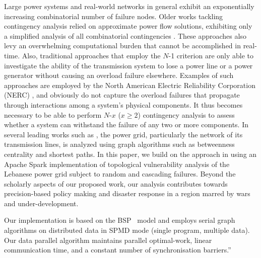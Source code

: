 Large power systems and real-world networks in general exhibit an exponentially increasing combinatorial number of failure nodes. Older works tackling contingency analysis relied on approximate power flow solutions, exhibiting only a simplified analysis of all combinatorial contingencies \cite{EjebeAl79,Ekwue91}. These approaches also levy an overwhelming computational burden that cannot be accomplished in real-time. Also, traditional approaches that employ the $N$-1 criterion are only able to investigate the ability of the transmission system to lose a power line or a power generator without causing an overload failure elsewhere. Examples of such approaches are employed by the North American Electric Reliability Corporation (NERC) \cite{JinAl10}, and obviously do not capture the overload failures that propagate through interactions among a system's physical components. It thus becomes necessary to be able to perform $N$-$x$ ($x \geq2$) contingency analysis to assess whether a system can withstand the failure of any two or more components. In several leading works such as \cite{2000Natur.406..378A,JinAl10, DaqingAl14}, the power grid, particularly the network of its transmission lines, is analyzed using graph algorithms such as betweenness centrality and shortest paths. In this paper, we build on the approach in  \cite{2000Natur.406..378A} using an Apache Spark implementation of topological vulnerability analysis of the Lebanese power grid subject to random  and cascading failures. Beyond the scholarly aspects of our proposed work, our analysis contributes towards precision-based policy making and disaster response in a region marred by wars and under-development. 
 
%
Our implementation is based on the BSP~\cite{bsp} model and employs serial graph algorithms on distributed data in SPMD mode (single program, multiple data). Our data parallel algorithm maintains parallel optimal-work, linear communication time, and a constant number of synchronisation barriers.”
%

